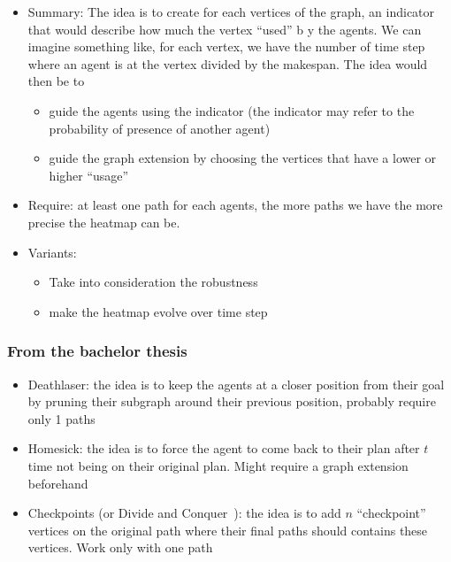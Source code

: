 \begin{itemize}
  \item Summary: The idea is to create for each vertices of the graph, an indicator that would describe how much the vertex ``used'' b y the agents. We can imagine something like, for each vertex, we have the number of time step where an agent is at the vertex divided by the makespan. The idea would then be to \begin{itemize}
    \item guide the agents using the indicator (the indicator may refer to the probability of presence of another agent)
    \item guide the graph extension by choosing the vertices that have a lower or higher ``usage''
  \end{itemize}
  \item Require: at least one path for each agents, the more paths we have the more precise the heatmap can be.
  \item Variants: \begin{itemize}
    \item Take into consideration the robustness~\cite{atstfewabazh20a,atstfestko20a}
    \item make the heatmap evolve over time step
  \end{itemize} 
\end{itemize}



\subsubsection{From the bachelor thesis}
\begin{itemize}
  \item Deathlaser: the idea is to keep the agents at a closer position from their goal by pruning their subgraph around their previous position, probably require only 1 paths
  \item Homesick: the idea is to force the agent to come back to their plan after $t$ time not being on their original plan. Might require a graph extension beforehand 
  \item Checkpoints (or Divide and Conquer~\cite{yulav16a}): the idea is to add $n$ ``checkpoint'' vertices on the original path where their final paths should contains these vertices. Work only with one path 
\end{itemize}


